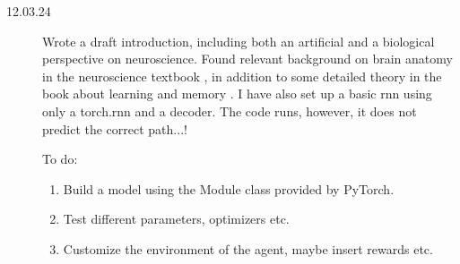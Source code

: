 \begin{description}
    \item[12.03.24] Wrote a draft introduction, including both an artificial and a biological perspective on neuroscience. Found relevant background on brain anatomy in the neuroscience textbook \cite{bear:2016:neuroscience}, in addition to some detailed theory in the book about learning and memory \cite{byrne:2008:learning_memory}. I have also set up a basic rnn using only a torch.rnn and a decoder. The code runs, however, it does not predict the correct path...! 

    To do: %
    \begin{enumerate}
        \item Build a model using the Module class provided by PyTorch.
        \item Test different parameters, optimizers etc.
        \item Customize the environment of the agent, maybe insert rewards etc.
    \end{enumerate}
\end{description}